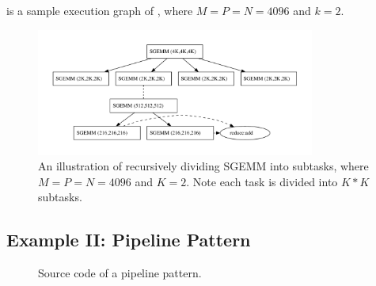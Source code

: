 
 is a sample execution graph of ,
where $M=P=N=4096$ and $k=2$.







\begin{figure}[htb]
\includegraphics[width=3.6in]{../mmexample}
\caption{An illustration of recursively dividing SGEMM into subtasks, where
$M=P=N=4096$ and $K=2$. Note each task is divided into $K*K$ subtasks.
}
\label{fig:mmexample}
\end{figure}


\subsection{Example II: Pipeline Pattern}

\begin{figure}[hbt]
  \caption{Source code of a pipeline pattern.}
  \label{fig:pipe:code}
\end{figure}

